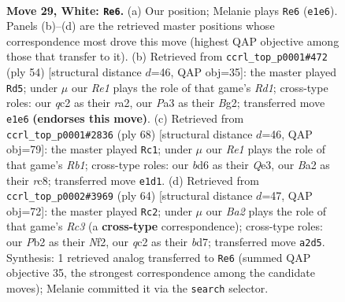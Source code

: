 \documentclass[11pt]{article}
\begin{document}
\clearpage

\begin{figure}[p]\centering
\begin{subfigure}{0.46\textwidth}\centering
\resizebox{\linewidth}{!}{%
\newchessgame
\chessboard[
  setfen={8/pp5p/3b2pk/8/8/P5P1/BPq2P1P/4R1K1 w - - 3 29},
  showmover=false,
  pgfstyle=straightmove, color=movearrow, markmove={e1-e6}
]}
\caption{}
\end{subfigure}\hfill
\begin{subfigure}{0.46\textwidth}\centering
\resizebox{\linewidth}{!}{%
\newchessgame
\chessboard[
  setfen={5k2/5ppp/4P3/1pb5/2p1P2P/6P1/rP3PB1/3R2K1 w - - 0 28},
  showmover=false,
  pgfstyle=straightmove, color=movearrow, markmove={d1-d5}
]}
\caption{}
\end{subfigure}
\\[4pt]
\begin{subfigure}{0.46\textwidth}\centering
\resizebox{\linewidth}{!}{%
\newchessgame
\chessboard[
  setfen={2r5/5pk1/4pp1p/8/4P3/4QPqP/6P1/1R5K w - - 5 35},
  showmover=false,
  pgfstyle=straightmove, color=movearrow, markmove={b1-c1}
]}
\caption{}
\end{subfigure}\hfill
\begin{subfigure}{0.46\textwidth}\centering
\resizebox{\linewidth}{!}{%
\newchessgame
\chessboard[
  setfen={8/3b1kpp/1q2p3/1P3p2/7P/2R2P2/5NP1/1R4K1 w - - 1 33},
  showmover=false,
  pgfstyle=straightmove, color=movearrow, markmove={c3-c2}
]}
\caption{}
\end{subfigure}
\caption{\textbf{Move 29, White: \texttt{Re6}.} (a) Our position; Melanie plays \texttt{Re6} (\texttt{e1e6}). Panels (b)--(d) are the retrieved master positions whose correspondence most drove this move (highest QAP objective among those that transfer to it). (b) Retrieved from \texttt{ccrl\_top\_p0001\#472} (ply 54) [structural distance $d$=46, QAP obj=35]: the master played \texttt{Rd5}; under $\mu$ our \emph{Re1} plays the role of that game's \emph{Rd1}; cross-type roles: our \emph{q}c2 as their \emph{r}a2, our \emph{P}a3 as their \emph{B}g2; transferred move \texttt{e1e6} \textbf{(endorses this move)}. (c) Retrieved from \texttt{ccrl\_top\_p0001\#2836} (ply 68) [structural distance $d$=46, QAP obj=79]: the master played \texttt{Rc1}; under $\mu$ our \emph{Re1} plays the role of that game's \emph{Rb1}; cross-type roles: our \emph{b}d6 as their \emph{Q}e3, our \emph{B}a2 as their \emph{r}c8; transferred move \texttt{e1d1}. (d) Retrieved from \texttt{ccrl\_top\_p0002\#3969} (ply 64) [structural distance $d$=47, QAP obj=72]: the master played \texttt{Rc2}; under $\mu$ our \emph{Ba2} plays the role of that game's \emph{Rc3} (a \textbf{cross-type} correspondence); cross-type roles: our \emph{P}b2 as their \emph{N}f2, our \emph{q}c2 as their \emph{b}d7; transferred move \texttt{a2d5}. Synthesis: 1 retrieved analog transferred to \texttt{Re6} (summed QAP objective 35, the strongest correspondence among the candidate moves); Melanie committed it via the \texttt{search} selector.}
\label{fig:thought-m56}
\end{figure}
\end{document}

